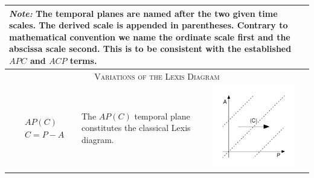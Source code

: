 \documentclass[
  12pt
]{scrartcl}
\begin{document}

\begin{center}
  \small
  \begin{longtable}{m{}m{}m{}m{}}
  \toprule
  \multicolumn{4}{m{0.9\textwidth}}{\footnotesize \emph{Note:} The temporal planes are named after the two given time scales. The derived scale is appended in parentheses. Contrary to mathematical convention we name the ordinate scale first and the abscissa scale second. This is to be consistent with the established $APC$ and $ACP$ terms.} \\
  \midrule
  \multicolumn{4}{c}{\textsc{Variations of the Lexis Diagram}} \\
  \midrule
  $$\begin{aligned}
    &AP(C) \\
    &C = P - A
  \end{aligned}$$ &
  The $AP(C)$ temporal plane constitutes the classical Lexis diagram. &
  \includegraphics[width = \linewidth]{../fig/APc.pdf} &

\end{longtable}
\end{center}
\end{document}
